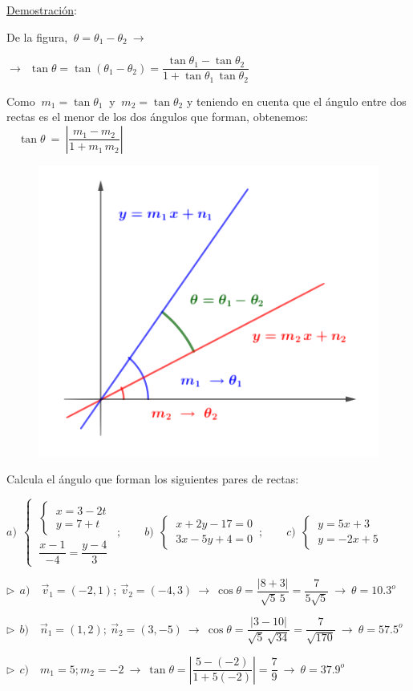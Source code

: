 \begin{multicols}{2}
\underline{Demostración}:

De la figura, $\ \theta=\theta_1-\theta_2 \ \to $

$\to \ \ \tan \theta = \tan(\theta_1-\theta_2)= \dfrac{\tan \theta_1-\tan \theta_2}{1+\tan \theta_1\, \tan \theta_2}$

Como $\ m_1=\tan \theta_1 \ $ y $\ m_2=\tan \theta_2$ y teniendo en cuenta que el ángulo entre dos rectas es el menor de los dos ángulos que forman, obtenemos:
$\quad \tan \theta \ = \ \left| \dfrac{m_1-m_2}{1+m_1\, m_2} \right|$ \QED
\begin{figure}[H]
	\centering
	\includegraphics[width=.4\textwidth]{img-ga/ga20.png}
\end{figure}
\end{multicols}
\vspace{5mm}

\begin{miejemplo}

Calcula el ángulo que forman los siguientes pares de rectas:	

\vspace{2mm} $a)\ \ \begin{cases} \ \begin{cases} \ x=3-2t\\ \ y=7+t \end{cases} \\ \ \dfrac{x-1}{-4}=\dfrac{y-4}{3} \end{cases} \, ; \qquad b)\ \ \begin{cases} \ x+2y-17=0 \\ \ 3x-5y+4=0 \end{cases}\, ; \qquad c)\ \ \begin{cases} \ y=5x+3 \\ \ y=-2x+5 \end{cases}$

\vspace{6mm} $\triangleright \ \ a) \quad \vec v_1=(-2,1);\ \vec v_2=(-4,3) \ \to \ \cos \theta=\dfrac{|8+3|}{\sqrt{5}\, 5}=\dfrac{7}{5\sqrt{5}} \ \to \ \theta=10.3^o$


\vspace{5mm} $\triangleright \ \ b) \quad \vec n_1=(1,2);\ \vec n_2=(3,-5) \ \to \ \cos \theta = \dfrac{|3-10|}{\sqrt{5}\, \sqrt{34}}=\dfrac{7}{\sqrt{170}} \ \to \ \theta= 57.5^o$


\vspace{5mm} $\triangleright \ \ c) \quad m_1=5;	 m_2=-2 \ \to \ \tan \theta= \left| \dfrac{5-(-2)}{1+5(-2)} \right|=\dfrac{7}{9} \ \to \ \theta=37.9^o$

\end{miejemplo}

